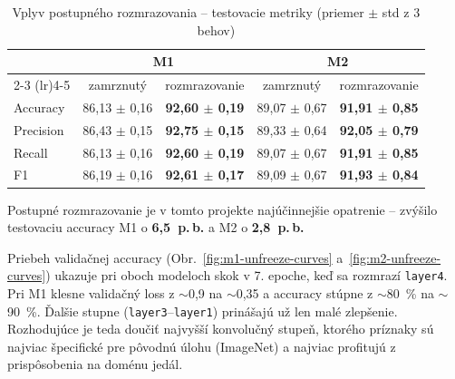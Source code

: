 \begin{table}[H]
    \centering
    \caption{Vplyv postupného rozmrazovania -- testovacie metriky (priemer $\pm$ std z 3 behov)}
    \label{tab:unfreeze-table}
    \footnotesize
    \begin{tabular}{lcccc}
        \toprule
         & \multicolumn{2}{c}{M1} & \multicolumn{2}{c}{M2} \\
        \cmidrule(lr){2-3} \cmidrule(lr){4-5}
         & zamrznutý & rozmrazovanie & zamrznutý & rozmrazovanie \\
        \midrule
        Accuracy  & 86,13 $\pm$ 0,16 & \textbf{92,60 $\pm$ 0,19} & 89,07 $\pm$ 0,67 & \textbf{91,91 $\pm$ 0,85} \\
        Precision & 86,43 $\pm$ 0,15 & \textbf{92,75 $\pm$ 0,15} & 89,33 $\pm$ 0,64 & \textbf{92,05 $\pm$ 0,79} \\
        Recall    & 86,13 $\pm$ 0,16 & \textbf{92,60 $\pm$ 0,19} & 89,07 $\pm$ 0,67 & \textbf{91,91 $\pm$ 0,85} \\
        F1        & 86,19 $\pm$ 0,16 & \textbf{92,61 $\pm$ 0,17} & 89,09 $\pm$ 0,67 & \textbf{91,93 $\pm$ 0,84} \\
        \bottomrule
    \end{tabular}
\end{table}

Postupné rozmrazovanie je v tomto projekte najúčinnejšie opatrenie --
zvýšilo testovaciu accuracy M1 o \textbf{6,5~p.\,b.} a M2
o \textbf{2,8~p.\,b.}





Priebeh validačnej accuracy (Obr.~\ref{fig:m1-unfreeze-curves}
a~\ref{fig:m2-unfreeze-curves}) ukazuje pri oboch modeloch skok
v 7. epoche, keď sa rozmrazí \texttt{layer4}. Pri M1 klesne validačný
loss z $\sim$0,9 na $\sim$0,35 a accuracy stúpne z $\sim$80~\% na
$\sim$90~\%. Ďalšie stupne (\texttt{layer3}--\texttt{layer1}) prinášajú už
len malé zlepšenie. Rozhodujúce je teda doučiť najvyšší konvolučný stupeň,
ktorého príznaky sú najviac špecifické pre pôvodnú úlohu (ImageNet)
a najviac profitujú z prispôsobenia na doménu jedál.

